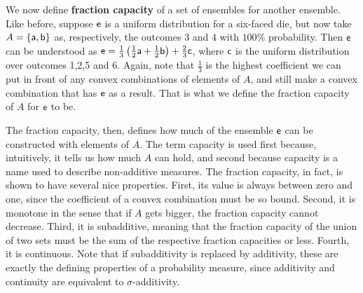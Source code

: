 We now define \textbf{fraction capacity} of a set of ensembles for another ensemble. Like before, suppose $\ens$ is a uniform distribution for a six-faced die, but now take $A = \{ \ens[a], \ens[b] \}$ as, respectively, the outcomes $3$ and $4$ with $100\%$ probability. Then $\ens$ can be understood as $\ens = \frac{1}{3} \left(\frac{1}{2} \ens[a] + \frac{1}{2} \ens[b] \right) + \frac{2}{3} \ens[c]$, where $\ens[c]$ is the uniform distribution over outcomes 1,2,5 and 6. Again, note that $\frac{1}{3}$ is the highest coefficient we can put in front of any convex combinations of elements of $A$, and still make a convex combination that has $\ens$ as a result. That is what we define the fraction capacity of $A$ for $\ens$ to be.

The fraction capacity, then, defines how much of the ensemble $\ens$ can be constructed with elements of $A$. The term capacity is used first because, intuitively, it tells us how much $A$ can hold, and second because capacity is a name used to describe non-additive measures. The fraction capacity, in fact, is shown to have several nice properties. First, its value is always between zero and one, since the coefficient of a convex combination must be so bound. Second, it is monotone in the sense that if $A$ gets bigger, the fraction capacity cannot decrease. Third, it is subadditive, meaning that the fraction capacity of the union of two sets must be the sum of the respective fraction capacities or less. Fourth, it is continuous. Note that if subadditivity is replaced by additivity, these are exactly the defining properties of a probability measure, since additivity and continuity are equivalent to $\sigma$-additivity.

